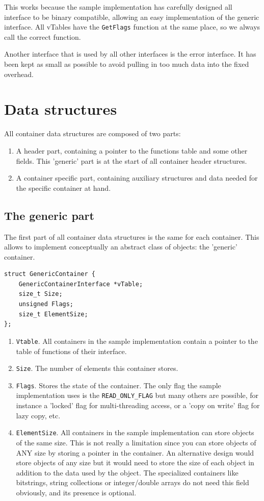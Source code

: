 \documentclass[12pt,a4paper,openany]{memoir} %
\begin{document}
{{This works because the sample implementation has carefully designed all interface to be binary compatible, allowing an easy implementation
of the generic interface. All vTables have the \texttt{GetFlags} function at the same place, so we always call the correct function.

Another interface that is used by all other interfaces is the error interface. It has been kept as small as possible to avoid pulling in too much
data into the fixed overhead.

\section{Data structures}
All container data structures are composed of two parts:
\begin{enumerate}
\item A header part, containing a pointer to the functions table and some other fields. This 'generic' part is at the start of all container header structures.
\item A container specific part, containing auxiliary structures and data needed for the specific container at hand.
\end{enumerate}
\subsection{The generic part}
The first part of all container data structures is the same for each container. This allows to implement conceptually an abstract class of objects: the 'generic' container.
\begin{verbatim}
struct GenericContainer {
    GenericContainerInterface *vTable;
    size_t Size;
    unsigned Flags;
    size_t ElementSize;
};
\end{verbatim}
\begin{enumerate}
\item \texttt{Vtable}. All containers in the sample implementation contain a pointer to the table of functions of their interface.
\item \texttt{Size}. The number of elements this container stores.
\item \texttt{Flags}. Stores the state of the container. The only flag the sample implementation uses is the \texttt{READ\_ONLY\_FLAG} but many others 
are possible, for instance a 'locked' flag for multi-threading access, or a 'copy on write' flag for lazy copy, etc.
\item \texttt{ElementSize}. All containers in the sample implementation can store objects of the same size. This is not really a limitation since you 
can store objects of ANY size by storing a pointer in the container.
An alternative design would store objects of any size but it would need to store the size of each object in addition to the data used by the object. 
The specialized containers like bitstrings, string collections or integer/double arrays do not need this field obviously, and its presence is optional.
\end{enumerate}
}}
\end{document}
